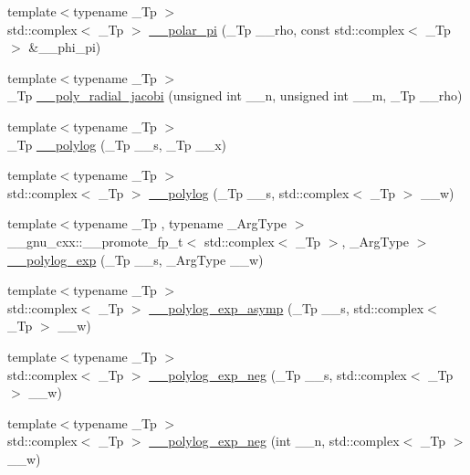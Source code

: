 \begin{DoxyCompactItemize}
\item 
{\footnotesize template$<$typename \+\_\+\+Tp $>$ }\\std\+::complex$<$ \+\_\+\+Tp $>$ \hyperlink{namespacestd_1_1____detail_a627c0e19f6b3e90af25735f351662d53}{\+\_\+\+\_\+polar\+\_\+pi} (\+\_\+\+Tp \+\_\+\+\_\+rho, const std\+::complex$<$ \+\_\+\+Tp $>$ \&\+\_\+\+\_\+phi\+\_\+pi)
\item 
{\footnotesize template$<$typename \+\_\+\+Tp $>$ }\\\+\_\+\+Tp \hyperlink{namespacestd_1_1____detail_af325d47042bc9661bbde61b13f368fec}{\+\_\+\+\_\+poly\+\_\+radial\+\_\+jacobi} (unsigned int \+\_\+\+\_\+n, unsigned int \+\_\+\+\_\+m, \+\_\+\+Tp \+\_\+\+\_\+rho)
\item 
{\footnotesize template$<$typename \+\_\+\+Tp $>$ }\\\+\_\+\+Tp \hyperlink{namespacestd_1_1____detail_a17fb8cea11706f319aaea277188a29c8}{\+\_\+\+\_\+polylog} (\+\_\+\+Tp \+\_\+\+\_\+s, \+\_\+\+Tp \+\_\+\+\_\+x)
\item 
{\footnotesize template$<$typename \+\_\+\+Tp $>$ }\\std\+::complex$<$ \+\_\+\+Tp $>$ \hyperlink{namespacestd_1_1____detail_aa14e3ca6e4bee5ac1f1e5e1c2cee1d5a}{\+\_\+\+\_\+polylog} (\+\_\+\+Tp \+\_\+\+\_\+s, std\+::complex$<$ \+\_\+\+Tp $>$ \+\_\+\+\_\+w)
\item 
{\footnotesize template$<$typename \+\_\+\+Tp , typename \+\_\+\+Arg\+Type $>$ }\\\+\_\+\+\_\+gnu\+\_\+cxx\+::\+\_\+\+\_\+promote\+\_\+fp\+\_\+t$<$ std\+::complex$<$ \+\_\+\+Tp $>$, \+\_\+\+Arg\+Type $>$ \hyperlink{namespacestd_1_1____detail_a31327d726731b1aad5502da2fb93b0e9}{\+\_\+\+\_\+polylog\+\_\+exp} (\+\_\+\+Tp \+\_\+\+\_\+s, \+\_\+\+Arg\+Type \+\_\+\+\_\+w)
\item 
{\footnotesize template$<$typename \+\_\+\+Tp $>$ }\\std\+::complex$<$ \+\_\+\+Tp $>$ \hyperlink{namespacestd_1_1____detail_af3684fc449da490e9a43985245618a90}{\+\_\+\+\_\+polylog\+\_\+exp\+\_\+asymp} (\+\_\+\+Tp \+\_\+\+\_\+s, std\+::complex$<$ \+\_\+\+Tp $>$ \+\_\+\+\_\+w)
\item 
{\footnotesize template$<$typename \+\_\+\+Tp $>$ }\\std\+::complex$<$ \+\_\+\+Tp $>$ \hyperlink{namespacestd_1_1____detail_a07b26b8c7ff467310e4e1df6e3efd893}{\+\_\+\+\_\+polylog\+\_\+exp\+\_\+neg} (\+\_\+\+Tp \+\_\+\+\_\+s, std\+::complex$<$ \+\_\+\+Tp $>$ \+\_\+\+\_\+w)
\item 
{\footnotesize template$<$typename \+\_\+\+Tp $>$ }\\std\+::complex$<$ \+\_\+\+Tp $>$ \hyperlink{namespacestd_1_1____detail_a313ae48e1c4ed3c5296c8e45614af3d5}{\+\_\+\+\_\+polylog\+\_\+exp\+\_\+neg} (int \+\_\+\+\_\+n, std\+::complex$<$ \+\_\+\+Tp $>$ \+\_\+\+\_\+w)

\end{DoxyCompactItemize}
